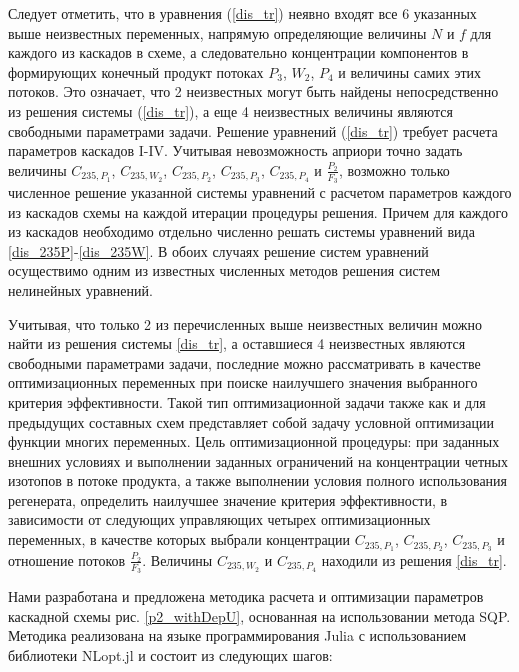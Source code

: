 Следует отметить, что в уравнения (\ref{dis_tr}) неявно входят все 6 указанных выше неизвестных переменных, напрямую определяющие величины $N$ и $f$ для каждого из каскадов в схеме, а следовательно концентрации компонентов в формирующих конечный продукт потоках $P_3$, $W_2$, $P_4$ и величины самих этих потоков. Это означает, что 2 неизвестных могут быть найдены непосредственно из решения системы (\ref{dis_tr}), а еще 4 неизвестных величины являются свободными параметрами задачи. Решение уравнений (\ref{dis_tr}) требует расчета параметров каскадов I-IV. Учитывая невозможность априори точно задать величины $C_{235,{P_1}}$, $C_{235,{W_2}}$, $C_{235,{P_2}}$, $C_{235,{P_3}}$, $C_{235,{P_4}}$ и $\frac{P_{2}}{F_3}$, возможно только численное решение указанной системы уравнений с расчетом параметров каждого из каскадов схемы на каждой итерации процедуры решения. Причем для каждого из каскадов необходимо отдельно численно решать системы уравнений вида \ref{dis_235P}-\ref{dis_235W}. В обоих случаях решение систем уравнений осуществимо одним из известных численных методов решения систем нелинейных уравнений. 

Учитывая, что только 2 из перечисленных выше неизвестных величин можно найти из решения системы \ref{dis_tr}, а оставшиеся 4 неизвестных являются свободными параметрами задачи, последние можно рассматривать в качестве оптимизационных переменных при поиске наилучшего значения выбранного критерия эффективности. Такой тип оптимизационной задачи также как и для предыдущих составных схем представляет собой задачу условной оптимизации функции многих переменных. Цель оптимизационной процедуры: при заданных внешних условиях и выполнении заданных ограничений на концентрации четных изотопов в потоке продукта, а также выполнении условия полного использования регенерата, определить наилучшее значение критерия эффективности, в зависимости от следующих управляющих четырех оптимизационных переменных, в качестве которых выбрали концентрации $C_{235,{P_1}}$, $C_{235,{P_2}}$, $C_{235,{P_3}}$ и отношение потоков $\frac{P_{2}}{F_3}$. Величины $C_{235,{W_2}}$ и $C_{235,{P_4}}$ находили из решения \ref{dis_tr}. 

Нами разработана и предложена методика расчета и оптимизации параметров каскадной схемы рис. \ref{p2_withDepU}, основанная на использовании метода SQP.
Методика реализована на языке программирования Julia с использованием библиотеки NLopt.jl \cite{NLopt} и состоит из следующих шагов:

